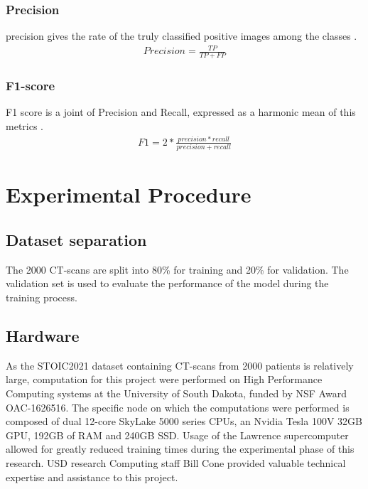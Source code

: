 \documentclass[12pt, letterpaper]{article}
\begin{document}
\subsubsection{Precision}
precision gives the rate of the truly classified positive images among the classes \cite{Karthik_2021}.
\begin{align}
    Precision = \frac{TP}{TP+FP}
\end{align}

\subsubsection{F1-score}
F1 score is a joint of Precision and Recall, expressed as a harmonic mean of this metrics \cite{Karthik_2021}.
\begin{align}
    F1 = 2*\frac{precision*recall}{precision+recall}
\end{align}

\newpage
\section{Experimental Procedure}

\subsection{Dataset separation}

The 2000 CT-scans are split into 80\% for training and 20\% for validation. The validation set is used to evaluate the performance of the model during the training process.

\subsection{Hardware}
As the STOIC2021 dataset containing CT-scans from 2000 patients is relatively large, computation for this project were performed on High Performance Computing systems at the University of South Dakota, funded by NSF Award OAC-1626516. The specific node on which the computations were performed is composed of dual 12-core SkyLake 5000 series CPUs, an Nvidia Tesla 100V 32GB GPU, 192GB of RAM and 240GB SSD. Usage of the Lawrence supercomputer allowed for greatly reduced training times during the experimental phase of this research. USD research Computing staff Bill Cone provided valuable technical expertise and assistance to this project.
\end{document}
